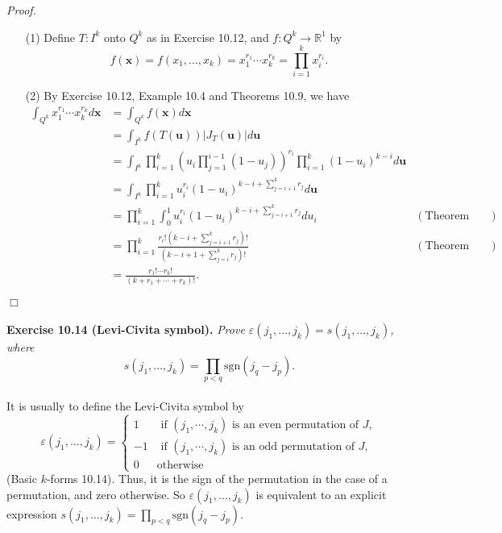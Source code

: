 \documentclass{article}
\begin{document}
\emph{Proof.}
\begin{enumerate}
\item[(1)]
  Define $T: I^k$ onto $Q^k$ as in Exercise 10.12,
  and $f: Q^k \to \mathbb{R}^1$ by
  \[
    f(\mathbf{x})
    = f(x_1, \ldots, x_k)
    = x_1^{r_1} \cdots x_k^{r_k}
    = \prod_{i=1}^{k} x_i^{r_i}.
  \]

\item[(2)]
  By Exercise 10.12, Example 10.4 and Theorems 10.9, we have
  \begin{align*}
    \int_{Q^k} x_1^{r_1} \cdots x_k^{r_k} d\mathbf{x}
    &=
    \int_{Q^k} f(\mathbf{x}) d\mathbf{x} \\
    &=
    \int_{I^k} f(T(\mathbf{u})) |J_T(\mathbf{u})| d\mathbf{u} \\
    &=
    \int_{I^k}
      \prod_{i=1}^{k} \left( u_i \prod_{j=1}^{i-1}(1-u_j) \right)^{r_i}
      \prod_{i=1}^{k}(1-u_i)^{k-i} d\mathbf{u} \\
    &=
    \int_{I^k}
      \prod_{i=1}^{k} u_i^{r_i} (1-u_i)^{k-i+\sum_{j=i+1}^{k}r_j} d\mathbf{u} \\
    &=
    \prod_{i=1}^{k}
      \int_{0}^{1} u_i^{r_i} (1-u_i)^{k-i+\sum_{j=i+1}^{k}r_j} du_i
      & (\text{Theorem 10.2}) \\
    &=
    \prod_{i=1}^{k}
      \frac{r_i! \left(k-i+\sum_{j=i+1}^{k}r_j\right)!}
        {\left(k-i+1+\sum_{j=i}^{k}r_j\right)!}
      & (\text{Theorem 8.20}) \\
    &=
    \frac{r_1! \cdots r_k!}{(k + r_1 + \cdots + r_k)!}.
  \end{align*}
\end{enumerate}
$\Box$ \\\\






\textbf{Exercise 10.14 (Levi-Civita symbol).}
\emph{Prove $\varepsilon(j_1, \ldots, j_k) = s(j_1, \ldots, j_k)$,
where}
\[
  s(j_1, \ldots, j_k) = \prod_{p < q} \mathrm{sgn}(j_q - j_p).
\] \\

It is usually to define the Levi-Civita symbol by
\begin{equation*}
\varepsilon(j_1, \ldots, j_k) =
  \begin{cases}
    1
      & \text{ if $(j_1,\cdots,j_k)$ is an even permutation of $J$}, \\
    -1
      & \text{ if $(j_1,\cdots,j_k)$ is an odd permutation of $J$}, \\
    0
      & \text{otherwise}
  \end{cases}
\end{equation*}
(Basic $k$-forms 10.14).
Thus, it is the sign of the permutation in the case of a permutation, and zero otherwise.
So $\varepsilon(j_1, \ldots, j_k)$ is equivalent to an explicit expression
$s(j_1, \ldots, j_k) = \prod_{p < q} \mathrm{sgn}(j_q - j_p)$. \\
\end{document}
